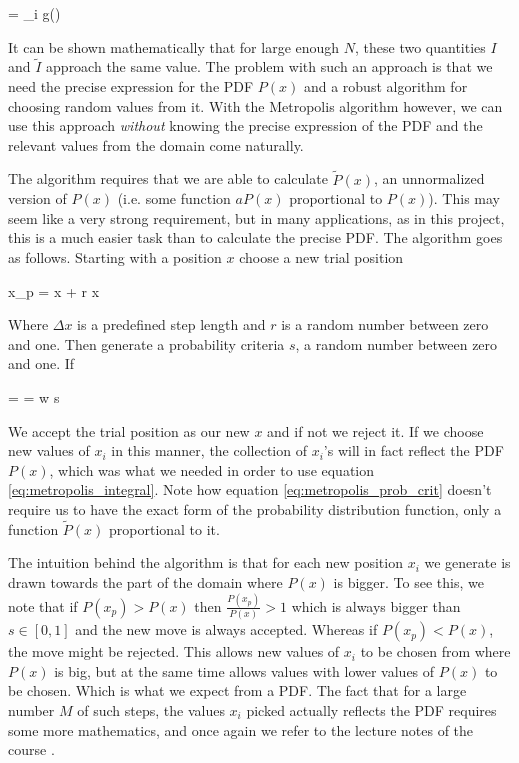 \eqs
{} =  \sum_i g()
\label{eq:metropolis_integral}
\eqf

It can be shown mathematically that for large enough $N$, these two quantities $I$ and $\tilde{I}$ approach the same value.  
The problem with such an approach is that we need the precise expression for the PDF $P(x)$ and a robust algorithm for choosing random values from it. 
With the Metropolis algorithm however, we can use this approach \textit{without} knowing the precise expression of the PDF and the relevant values from the domain come naturally. 

The algorithm requires that we are able to calculate $\tilde{P}(x)$, an unnormalized version of $P(x)$ (i.e. some function $aP(x)$ proportional to $P(x)$). 
This may seem like a very strong requirement, but in many applications, as in this project, this is a much easier task than to calculate the precise PDF. 
The algorithm goes as follows. 
Starting with a position $x$ choose a new trial position 

\eqs x_p = x + r \Delta x \eqf

Where $\Delta x$ is a predefined step length and $r$ is a random number between zero and one. 
Then generate a probability criteria $s$, a random number between zero and one. 
If 

\eqs {} =  =  \equiv w \geq s 
\label{eq:metropolis_prob_crit}\eqf

We accept the trial position as our new $x$ and if not we reject it. 
If we choose new values of $x_i$ in this manner, the collection of $x_i$'s will in fact reflect the PDF $P(x)$, which was what we needed in order to use equation \ref{eq:metropolis_integral}. 
Note how equation \ref{eq:metropolis_prob_crit} doesn't require us to have the exact form of the probability distribution function, only a function $\tilde{P}(x)$ proportional to it. 

The intuition behind the algorithm is that for each new position $x_i$ we generate is drawn towards the part of the domain where $P(x)$ is bigger. 
To see this, we note that if $P(x_p) > P(x)$ then $\frac{P(x_p)}{P(x)}>1$ which is always bigger than $s \in [0,1]$ and the new move is always accepted.
Whereas if $P(x_p)<P(x)$, the move might be rejected. 
This allows new values of $x_i$ to be chosen from where $P(x)$ is big, but at the same time allows values with lower values of $P(x)$ to be chosen. 
Which is what we expect from a PDF. 
The fact that for a large number $M$ of such steps, the values $x_i$ picked actually reflects the PDF requires some more mathematics, and once again we refer to the lecture notes of the course \cite{lecturenotes}.

